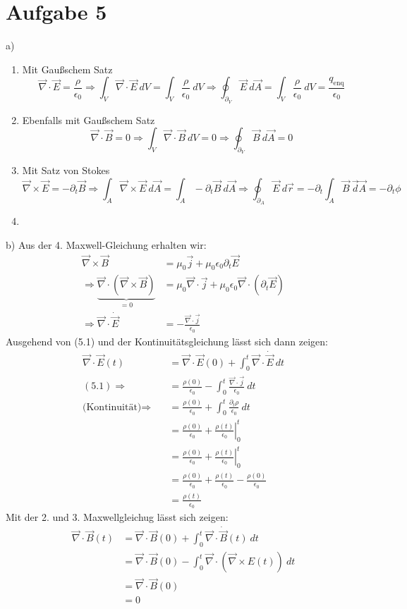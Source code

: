 \documentclass[11pt a4paper]{article}
\newcommand{\delt}{\partial_t}
\newcommand{\epsz}{\epsilon_0}
\newcommand{\diver}{\vec \nabla \cdot}
\newcommand{\rot}{\vec \nabla \times}
\begin{document}
\newpage

\section*{Aufgabe 5}
a) 
\begin{enumerate}
	\item Mit Gaußschem Satz
	\[ 
		\diver \vec E = \frac{\rho}{\epsz} 
		\Rightarrow
		\int_V \diver \vec E \ dV = \int_V \frac{\rho}{\epsz} \ dV 
		\Rightarrow
		\oint_{\partial_V} \vec E \ d\vec A = \int_V \frac{\rho}{\epsz} \ dV 
		= \frac{q_\text{enq}}{\epsz}
	\]
	\item Ebenfalls mit Gaußschem Satz
	\[
		\diver \vec B = 0
		\Rightarrow
		\int_V \diver \vec B \ dV = 0
		\Rightarrow
		\oint_{\partial_V} \vec B \ d\vec A = 0
	\]
	\item Mit Satz von Stokes
	\[
		\rot \vec E = -\delt \vec B
		\Rightarrow
		\int_A \rot \vec E \ d\vec A = \int_A -\delt \vec B \ d\vec A
		\Rightarrow
		\oint_{\partial_A} \vec E \ d\vec r = -\delt \int_A \vec B \ \vec d\vec A = -\delt \phi
	\]
	\item 
\end{enumerate}
b) Aus der 4. Maxwell-Gleichung erhalten wir:
\begin{align*}
	\rot \vec B 
	&= \mu_0 \vec j + \mu_0 \epsz \delt \vec E \\
	\Rightarrow
	\underbrace{\diver \left(\rot \vec B \right)}_{=0}
	&= \mu_0 \diver \vec j + \mu_0 \epsz \diver \left( \delt \vec E \right) \\
	\Rightarrow
	\diver \dot{\vec E}
	&= - \frac{\diver \vec j}{\epsz} \tag{5.1}
\end{align*}
Ausgehend von (5.1) und der Kontinuitätsgleichung lässt sich dann zeigen:
\begin{align*}
	\diver \vec E(t) 
	&= \diver \vec E(0) + \int_0^t \diver \dot{\vec E} \ dt \\
	(5.1) \Rightarrow \quad
	&= \frac{\rho(0)}{\epsz} - \int_0^t \frac{\diver \vec j}{\epsz} \ dt \\
	\text{(Kontinuität)} \Rightarrow \quad
	&= \frac{\rho(0)}{\epsz} + \int_0^t \frac{\delt \rho}{\epsz} \ dt \\
	&= \frac{\rho(0)}{\epsz} + \left. \frac{\rho(t)}{\epsz} \right|_0^t \\
	&= \frac{\rho(0)}{\epsz} + \left. \frac{\rho(t)}{\epsz} \right|_0^t \\
	&= \frac{\rho(0)}{\epsz} + \frac{\rho(t)}{\epsz} - \frac{\rho(0)}{\epsz} \\
	&= \frac{\rho(t)}{\epsz}
\end{align*}
Mit der 2. und 3. Maxwellgleichug lässt sich zeigen:
\begin{align*}
	\diver \vec B(t) 
	&= \diver \vec B(0) + \int_0^t \diver \dot{\vec B}(t) \ dt \\
	&= \diver \vec B(0) - \int_0^t \diver \left( \rot E(t) \right) \ dt \\
	&= \diver \vec B(0) \\
	&= 0
\end{align*}
\end{document}
